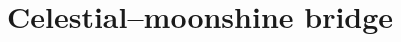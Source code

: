 %
%

\providecommand{\cA}{\mathcal A}
\providecommand{\cB}{\mathcal B}
\providecommand{\cC}{\mathcal C}
\providecommand{\cE}{\mathcal E}
\providecommand{\cF}{\mathcal F}
\providecommand{\cH}{\mathcal H}
\providecommand{\cI}{\mathcal I}
\providecommand{\cL}{\mathcal L}
\providecommand{\cM}{\mathcal M}
\providecommand{\cO}{\mathcal O}
\providecommand{\cP}{\mathcal P}
\providecommand{\cS}{\mathcal S}
\providecommand{\cT}{\mathcal T}
\providecommand{\cW}{\mathcal W}
\providecommand{\frakg}{\mathfrak g}
\providecommand{\frakk}{\mathfrak k}
\providecommand{\frakm}{\mathfrak m}
\providecommand{\RR}{\mathbb R}
\providecommand{\CC}{\mathbb C}
\providecommand{\PP}{\mathbb P}
\providecommand{\ZZ}{\mathbb Z}
\providecommand{\NN}{\mathbb N}
\providecommand{\HH}{\mathbb H}
\providecommand{\scri}{\mathscr I}
\providecommand{\Ran}{\operatorname{Ran}}
\providecommand{\Sym}{\operatorname{Sym}}
\providecommand{\Obs}{\operatorname{Obs}}
\providecommand{\End}{\operatorname{End}}
\providecommand{\Hom}{\operatorname{Hom}}
\providecommand{\Res}{\operatorname{Res}}
\providecommand{\Tr}{\operatorname{Tr}}
\providecommand{\Mel}{\widetilde}
\providecommand{\SCchtop}{\mathsf{SC}^{\mathrm{ch,top}}}
\providecommand{\Barch}{\mathrm B^{\mathrm{ch}}}
\providecommand{\BarchOrd}{\mathrm B^{\mathrm{ch},\mathrm{ord}}}
\providecommand{\ChirHoch}{\mathrm{ChirHoch}}
\providecommand{\dlog}{\mathrm d\log}
\providecommand{\delbar}{\bar\partial}
\providecommand{\wtc}{\mathfrak w_{1+\infty}}
\providecommand{\kapch}{\kappaChHodge}
\providecommand{\kapcat}{\kappa_{\mathrm{cat}}}
\providecommand{\kapBKM}{\kappa_{\mathrm{BKM}}}
\providecommand{\kapfiber}{\kappa_{\mathrm{fiber}}}
\providecommand{\cAcel}{\cA^{\mathrm{cel}}}
\providecommand{\MtwFour}{M_{24}}
\providecommand{\Zder}{Z^{\mathrm{der}}_{\mathrm{ch}}}

\section{Celestial--moonshine bridge}
\label{sec:celestial-moonshine-bridge}


